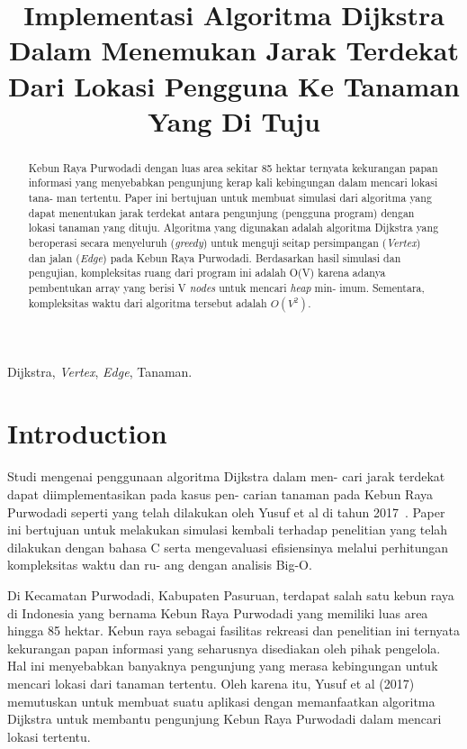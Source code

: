 \documentclass[conference]{IEEEtran}
\title{Implementasi Algoritma Dijkstra Dalam
Menemukan Jarak Terdekat Dari Lokasi Pengguna
Ke Tanaman Yang Di Tuju}
\author{\IEEEauthorblockN{Muhammad Hanif Hibatullah}
\IEEEauthorblockA{\textit{School of Electrical Engineering and Informatics}\\
\textit{Institut Teknologi Bandung}\\
Bandung, Indonesia\\
13220051@std.stei.itb.ac.id
}
}
\begin{document}
\maketitle

\begin{abstract}
    Kebun Raya Purwodadi dengan luas area sekitar 85
    hektar ternyata kekurangan papan informasi yang menyebabkan
    pengunjung kerap kali kebingungan dalam mencari lokasi tana-
    man tertentu. Paper ini bertujuan untuk membuat simulasi
    dari algoritma yang dapat menentukan jarak terdekat antara
    pengunjung (pengguna program) dengan lokasi tanaman yang
    dituju. Algoritma yang digunakan adalah algoritma Dijkstra
    yang beroperasi secara menyeluruh (\textit{greedy}) untuk menguji
    seitap persimpangan (\textit{Vertex}) dan jalan (\textit{Edge}) pada Kebun
    Raya Purwodadi. Berdasarkan hasil simulasi dan pengujian,
    kompleksitas ruang dari program ini adalah O(V) karena adanya
    pembentukan array yang berisi V \textit{nodes} untuk mencari \textit{heap} min-
    imum. Sementara, kompleksitas waktu dari algoritma tersebut adalah \boldmath$O(V^2)$.
\end{abstract}


\begin{IEEEkeywords}
    Dijkstra, \textit{Vertex}, \textit{Edge}, Tanaman.
\end{IEEEkeywords}
\section{Introduction}
    Studi mengenai penggunaan algoritma Dijkstra dalam men-
    cari jarak terdekat dapat diimplementasikan pada kasus pen-
    carian tanaman pada Kebun Raya Purwodadi seperti yang telah
    dilakukan oleh Yusuf et al di tahun 2017~\cite{yusuf2017implementasi}. 
    Paper ini bertujuan untuk melakukan simulasi kembali terhadap penelitian
    yang telah dilakukan dengan bahasa C serta mengevaluasi
    efisiensinya melalui perhitungan kompleksitas waktu dan ru-
    ang dengan analisis Big-O.

    Di Kecamatan Purwodadi, Kabupaten Pasuruan, terdapat
    salah satu kebun raya di Indonesia yang bernama Kebun
    Raya Purwodadi yang memiliki luas area hingga 85 hektar.
    Kebun raya sebagai fasilitas rekreasi dan penelitian ini ternyata
    kekurangan papan informasi yang seharusnya disediakan oleh
    pihak pengelola. Hal ini menyebabkan banyaknya pengunjung
    yang merasa kebingungan untuk mencari lokasi dari tanaman
    tertentu. Oleh karena itu, Yusuf et al (2017) memutuskan
    untuk membuat suatu aplikasi dengan memanfaatkan algoritma
    Dijkstra untuk membantu pengunjung Kebun Raya Purwodadi
    dalam mencari lokasi tertentu.
\end{document}
